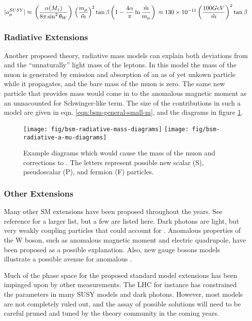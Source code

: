 \begin{equation}
\label{eqn:bsm-a-mu-susy}
|a_\mu^{SUSY}| \approx \\
\left(\frac{\alpha(M_z)}{8 \pi \sin^2{\theta_W}} \right) \\
\left( \frac{m_\mu}{\tilde{m}} \right)^2 \tan{\beta} \\
\left(1 - \frac{4\alpha}{\pi}\ln{\frac{\tilde{m}}{m_\mu}} \right) \\
\approx 130 \times 10^{-11} \\
\left(\frac{100 GeV}{\tilde{m}} \right)^2 \tan{\beta}
\end{equation}

\subsubsection{Radiative Extensions}
Another proposed theory, radiative mass models can explain both deviations from \gmtwo and the ``unnaturally'' light mass of the leptons.  In this model the mass of the muon is generated by emission and absorption of an as of yet unkown particle while it propagates, and the bare mass of the muon is zero.  The same new particle that provides mass would come in to the anomalous magnetic moment as an unnacounted for Schwinger-like term.  The size of the contributions in such a model are given in eqn. \ref{eqn:bsm-general-small-m}, and the diagrams in figure \ref{fig:bsm-radiative-diagrams}\cite{a-mu-harbinger}.

\begin{figure}
\label{fig:bsm-radiative-diagrams}
\centering
\texttt{[image: fig/bsm-radiative-mass-diagrams]}
\texttt{[image: fig/bsm-radiative-a-mu-diagrams]}
\caption{Example diagrams which would cause the mass of the muon and corrections to \mugmtwo.  The letters represent possible new scalar (S), pseudoscalar (P), and fermion (F) particles.}
\end{figure}

\subsubsection{Other Extensions}

Many other SM extensions have been proposed throughout the years.  See reference \cite{a-mu-harbinger} for a larger list, but a few are listed here.  Dark photons are light, but very weakly coupling particles that could account for \mugmtwo.  Anomalous properties of the W boson, such as anomalous magnetic moment and electric quadrupole, have been proposed as a possible explanation.  Also, new gauge bosons models illustrate a possible avenue for anomalous \gmtwo.

Much of the phase space for the proposed standard model extensions has been impinged upon by other measurements.  The LHC for instance has constrained the parameters in many SUSY models and dark photons.  However, most models are not completely ruled out, and the assay of possible solutions will need to be careful pruned and tuned by the theory community in the coming years.
